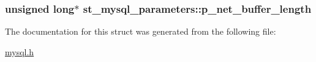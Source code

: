 \subsubsection[{p\+\_\+net\+\_\+buffer\+\_\+length}]{\setlength{\rightskip}{0pt plus 5cm}unsigned long$\ast$ st\+\_\+mysql\+\_\+parameters\+::p\+\_\+net\+\_\+buffer\+\_\+length}\label{structst__mysql__parameters_a9444966bdb70fba3bbf63b75c5ec0445}


The documentation for this struct was generated from the following file\+:\begin{DoxyCompactItemize}
\item 
\hyperlink{mysql_8h}{mysql.\+h}\end{DoxyCompactItemize}
